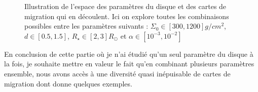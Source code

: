 \begin{figure}[htbp]
\hfill
{}\hfill
{}\hfill
{}\hfill
\caption{Illustration de l'espace des paramètres du disque et des cartes de migration qui en découlent. Ici on explore toutes les combinaisons possibles entre les paramètres suivants : $\Sigma_0\in[300, 1200]\unit{g/cm^2}$, $d\in[0.5, 1.5]$, $R_\star\in[2, 3]R_\odot$ et $\alpha\in[10^{-3}, 10^{-2}]$}\label{fig:parameter_space}
\end{figure}

En conclusion de cette partie où je n'ai étudié qu'un seul paramètre du disque à la fois, je souhaite mettre en valeur le fait qu'en combinant plusieurs paramètres ensemble, nous avons accès à une diversité quasi inépuisable de cartes de migration dont  donne quelques exemples. 
